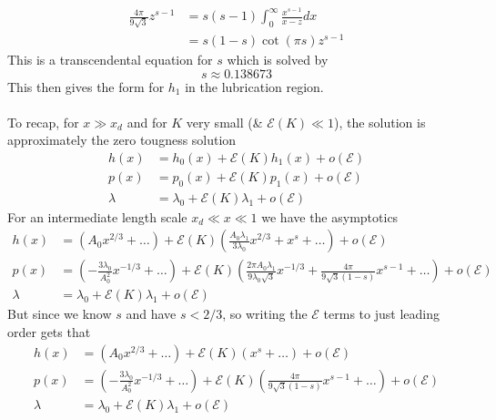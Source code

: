 \documentclass{article}
\newcommand{\cE}{\mathcal{E}}                               %
\begin{document}
\begin{align*}
\frac{4\pi}{9\sqrt{3}}z^{s-1} &= s(s-1)\int_0^{\infty} \frac{x^{s-1}}{x-z} dx \\
&= s(1-s) \cot(\pi s) z^{s-1} 
\end{align*}
This is a transcendental equation for $s$ which is solved by
\[ s \approx 0.138673 \]
This then gives the form for $h_1$ in the lubrication region.
\\
\\
To recap, for $x \gg x_d$ and for $K$ very small (\& $\cE(K) \ll 1$), the 
solution is approximately the zero tougness solution
\begin{align*}
h(x) &= h_0(x) + \cE(K)h_1(x)+o(\cE) \\
p(x) &= p_0(x) + \cE(K)p_1(x)+o(\cE) \\
\lambda &= \lambda_0 + \cE(K)\lambda_1+o(\cE) 
\end{align*}
For an intermediate length scale $x_d \ll x \ll 1$ we have the asymptotics
\begin{align*}
h(x) &= (A_0x^{2/3}+\dots) + \cE(K)(\frac{A_0\lambda_1}{3\lambda_0}x^{2/3}
+x^s+\dots)+o(\cE) \\
p(x) &= (-\frac{3\lambda_0}{A_0^2}x^{-1/3}+\dots)
 + \cE(K)(\frac{2\pi A_0\lambda_1}{9\lambda_0\sqrt{3}}x^{-1/3}
+\frac{4\pi}{9\sqrt{3}(1-s)}x^{s-1}+\dots)+o(\cE) \\
\lambda &= \lambda_0 + \cE(K)\lambda_1+o(\cE) 
\end{align*}
But since we know $s$ and have $s<2/3$, so writing the $\cE$ terms to
just leading order gets that 
\begin{align*}
h(x) &= (A_0x^{2/3}+\dots) + \cE(K)(x^s+\dots)+o(\cE) \\
p(x) &= (-\frac{3\lambda_0}{A_0^2}x^{-1/3}+\dots)
 + \cE(K)(\frac{4\pi}{9\sqrt{3}(1-s)}x^{s-1}+\dots)+o(\cE) \\
\lambda &= \lambda_0 + \cE(K)\lambda_1+o(\cE) 
\end{align*}
%
\end{document}
